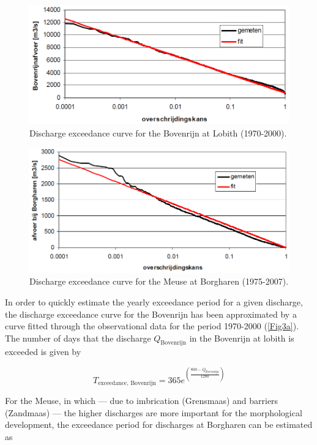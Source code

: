\begin{figure}
\includegraphics[width=\columnwidth]{figures/Fig3a.png}
\caption{Discharge exceedance curve for the Bovenrijn at Lobith (1970-2000).}
\label{Fig3a}
\end{figure}

\begin{figure}
\includegraphics[width=\columnwidth]{figures/Fig3b.png}
\caption{Discharge exceedance curve for the Meuse at Borgharen (1975-2007).}
\label{Fig3b}
\end{figure}

In order to quickly estimate the yearly exceedance period for a given discharge, the discharge exceedance curve for the Bovenrijn has been approximated by a curve fitted through the observational data for the period 1970-2000 (\autoref{Fig3a}).
The number of days that the discharge $Q_\text{Bovenrijn}$ in the Bovenrijn at lobith is exceeded is given by

\begin{equation}
\label{Eq1a}
T_\text{exceedance, Bovenrijn} = 365 e^{\left ( \frac{800 -  Q_\text{Bovenrijn}}{1280} \right )}
\end{equation}

For the Meuse, in which --- due to imbrication (Grensmaas) and barriers (Zandmaas) --- the higher discharges are more important for the morphological development, the exceedance period for discharges at Borgharen can be estimated as

